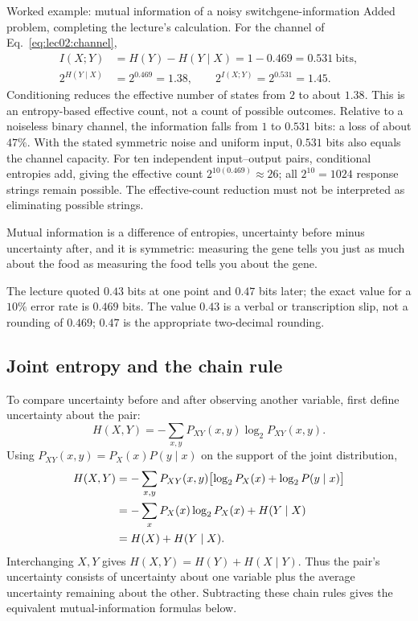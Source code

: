 \begin{example}[unbreakable,fontupper=\small]{Worked example: mutual information of a noisy switch}{gene-information}
Added problem, completing the lecture's calculation. For the channel of Eq.~\eqref{eq:lec02:channel},
\begin{align}
I(X;Y)&=H(Y)-H(Y\mid X)=1-0.469=0.531\ \text{bits},\label{eq:lec02:worked-mi}\\
2^{H(Y\mid X)}&=2^{0.469}=1.38,\qquad
2^{I(X;Y)}=2^{0.531}=1.45.\label{eq:lec02:worked-eff}
\end{align}
Conditioning reduces the effective number of states from $2$ to about $1.38$. This is an entropy-based effective count, not a count of possible outcomes. Relative to a noiseless binary channel, the information falls from $1$ to $0.531$ bits: a loss of about $47\%$. With the stated symmetric noise and uniform input, $0.531$ bits also equals the channel capacity. For ten independent input--output pairs, conditional entropies add, giving the effective count $2^{10(0.469)}\approx26$; all $2^{10}=1024$ response strings remain possible. The effective-count reduction must not be interpreted as eliminating possible strings.

Mutual information is a difference of entropies, uncertainty before minus uncertainty after, and it is symmetric: measuring the gene tells you just as much about the food as measuring the food tells you about the gene.
\end{example}

\begin{remark}
The lecture quoted $0.43$ bits at one point and $0.47$ bits later; the exact value for a $10\%$ error rate is $0.469$ bits. The value $0.43$ is a verbal or transcription slip, not a rounding of $0.469$; $0.47$ is the appropriate two-decimal rounding.
\end{remark}

\subsection{Joint entropy and the chain rule}\label{subsec:lec02:chain-rule}
To compare uncertainty before and after observing another variable, first define uncertainty about the pair:
\begin{equation}\label{eq:lec02:joint-entropy}
H(X,Y)=-\sum_{x,y}P_{XY}(x,y)\log_2 P_{XY}(x,y).
\end{equation}
Using $P_{XY}(x,y)=P_X(x)P(y\mid x)$ on the support of the joint distribution,
\begin{align}
H(X,Y)&=-\sum_{x,y}P_{XY}(x,y)\bigl[\log_2P_X(x)+\log_2P(y\mid x)\bigr]\notag\\
&=-\sum_xP_X(x)\log_2P_X(x)+H(Y\mid X)\notag\\
&=H(X)+H(Y\mid X).\label{eq:lec02:chain-rule}
\end{align}
Interchanging $X,Y$ gives $H(X,Y)=H(Y)+H(X\mid Y)$. Thus the pair's uncertainty consists of uncertainty about one variable plus the average uncertainty remaining about the other. Subtracting these chain rules gives the equivalent mutual-information formulas below.

